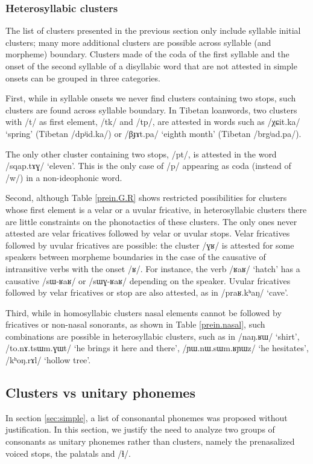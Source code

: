 \documentclass[oldfontcommands,oneside,a4paper,11pt]{article}
\newcommand{\ipa}[1]{/#1/} %
\begin{document}
 
 
 \subsubsection{Heterosyllabic clusters} \label{sec:heterosyllabic.clusters}
 
 The list of clusters presented in the previous section only include syllable initial clusters; many more additional clusters are possible across syllable (and morpheme) boundary. Clusters made of the coda of the first syllable and the onset of the second syllable of a disyllabic word that are not attested in simple onsets can be grouped in three categories.
 
 First, while in syllable onsets we never find clusters containing two stops, such clusters are found across syllable boundary. In Tibetan loanwords, two clusters with \ipa{t} as first element,  \ipa{tk} and \ipa{tp}, are attested in words such as \ipa{χɕit.ka} `spring' (Tibetan \ipa{dpʲid.ka}) or \ipa{βɟɤt.pa} `eighth month' (Tibetan \ipa{brgʲad.pa}). 
 
 The only  other cluster containing two stops, \ipa{pt}, is attested in the word  \ipa{sqap.tɤɣ} `eleven'. This is the only case of \ipa{p} appearing as coda (instead of \ipa{w}) in a non-ideophonic  word.
 
 Second, although Table \ref{prein.G.R} shows restricted possibilities for clusters whose first element is a velar or a uvular fricative, in heterosyllabic clusters there are little constraints on the phonotactics of these clusters. The only ones never attested are velar fricatives followed by velar or uvular stops. Velar fricatives followed by uvular fricatives are possible:  the cluster \ipa{ɣʁ} is attested for some speakers between morpheme boundaries in the case of the causative of intransitive verbs with the onset \ipa{ʁ}. For instance, the verb \ipa{ʁaʁ} `hatch' has a causative \ipa{sɯ-ʁaʁ} or \ipa{sɯɣ-ʁaʁ} depending on the speaker. Uvular fricatives followed by velar fricatives or stop are also attested, as in \ipa{praʁ.kʰaŋ} `cave'.
 
Third, while in homosyllabic clusters nasal elements cannot be followed by fricatives or non-nasal sonorants, as shown in Table \ref{prein.nasal}, such combinations are possible in heterosyllabic clusters, such as in \ipa{naŋ.ʁɯ} `shirt', \ipa{to.nɤ.tsɯm.ɣɯt} `he brings it here and there', \ipa{ɲɯ.nɯ.sɯm.ʁɲɯz} `he hesitates', \ipa{kʰoŋ.rɤl} `hollow tree'.

      \subsection{Clusters vs unitary phonemes} \label{sec:non.clusters}
      In section \ref{sec:simple}, a list of consonantal phonemes was proposed without justification. In this section, we justify the need to analyze two groups of consonants as unitary phonemes rather than clusters, namely the prenasalized voiced stops, the palatals and \ipa{ɬ}.
      
\end{document}
